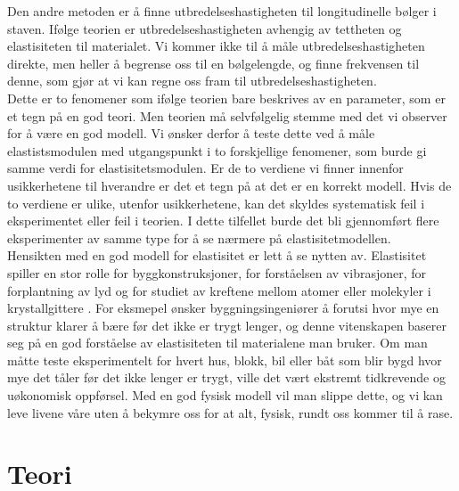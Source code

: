 \documentclass[%
 reprint,
 amsmath,amssymb,
 aps,
 norsk,
 booktabs
]{revtex4-1}
\begin{document}
Den andre metoden er å finne utbredelseshastigheten til longitudinelle bølger i staven. Ifølge teorien er utbredelseshastigheten avhengig av tettheten og elastisiteten til materialet. Vi kommer ikke til å måle utbredelseshastigheten direkte, men heller å begrense oss til en bølgelengde, og finne frekvensen til denne, som gjør at vi kan regne oss fram til utbredelseshastigheten.\\
Dette er to fenomener som ifølge teorien bare beskrives av en parameter, som er et tegn på en god teori. Men teorien må selvfølgelig stemme med det vi observer for å være en god modell. Vi ønsker derfor å teste dette ved å måle elastistsmodulen med utgangspunkt i to forskjellige fenomener, som burde gi samme verdi for elastisitetsmodulen. Er de to verdiene vi finner innenfor usikkerhetene til hverandre er det et tegn på at det er en korrekt modell. Hvis de to verdiene er ulike, utenfor usikkerhetene, kan det skyldes systematisk feil i eksperimentet eller feil i teorien. I dette tilfellet burde det bli gjennomført flere eksperimenter av samme type for å se nærmere på elastisitetmodellen.\\
Hensikten med en god modell for elastisitet er lett å se nytten av. Elastisitet spiller en stor rolle for byggkonstruksjoner, for forståelsen av vibrasjoner, for forplantning av lyd og for studiet av kreftene mellom atomer eller molekyler i krystallgittere \cite{gronn}. For eksmepel ønsker byggningsingeniører å forutsi hvor mye en struktur klarer å bære før det ikke er trygt lenger, og denne vitenskapen baserer seg på en god forståelse av elastisiteten til materialene man bruker. Om man måtte teste eksperimentelt for hvert hus, blokk, bil eller båt som blir bygd hvor mye det tåler før det ikke lenger er trygt, ville det vært ekstremt tidkrevende og uøkonomisk oppførsel. Med en god fysisk modell vil man slippe dette, og vi kan leve livene våre uten å bekymre oss for at alt, fysisk, rundt oss kommer til å rase.
\section{Teori}
\end{document}
